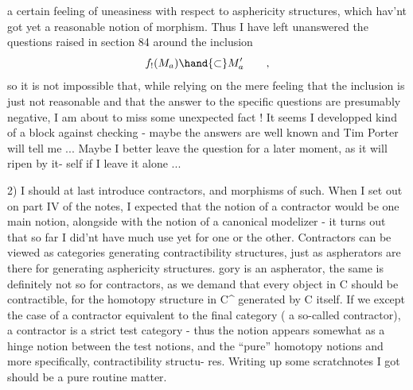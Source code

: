 
a certain feeling of uneasiness with respect to asphericity structures,
which hav'nt got yet a reasonable notion of morphism. Thus I have left
unanswered the questions raised in section 84 around the inclusion 
\[ f_{!}(M_{a}) \hand{\subset} M'_{a} \qquad , \]
so it is not impossible that, while relying on the mere feeling that
the inclusion is just not reasonable and that the answer to the specific
questions are presumably negative, I am about to miss some unexpected 
 fact ! It seems I developped kind of a block against checking -
maybe the answers are well known and Tim Porter will tell me ... Maybe
I better leave the question for a later moment, as it will ripen by it-%
self if I leave it alone ...

2) I should at last introduce contractors, and morphisms of such.
When I set out on part IV of the notes, I expected that the notion of a
contractor would be one main notion, alongside with the notion of a
canonical modelizer - it turns out that so far I did'nt have much use
yet for one or the other. Contractors can be viewed as  categories
generating contractibility structures, just as aspherators are there
for generating asphericity structures.
gory is an aspherator, the same is definitely not so for contractors,
as we demand that every object in C should be contractible, for the
homotopy structure in C\^{} generated by C itself. If we except the case
of a contractor equivalent to the final category ( a so-called \hand{\uline{\textcolor{black}{trivial}}}
contractor), a contractor is a strict test category - thus the notion
appears somewhat as a hinge notion between the test notions, and the
``pure'' homotopy notions and more specifically, contractibility structu-%
res. Writing up some scratchnotes I got should be a pure routine matter.


